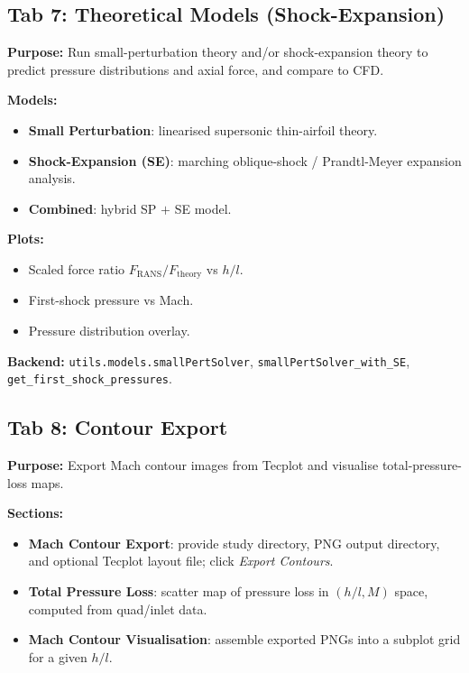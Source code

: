 \documentclass[11pt,letterpaper]{article}
\begin{document}
\subsection{Tab 7: Theoretical Models (Shock-Expansion)}

\textbf{Purpose:} Run small-perturbation theory and/or shock-expansion theory
to predict pressure distributions and axial force, and compare to CFD.

\textbf{Models:}
\begin{itemize}
  \item \textbf{Small Perturbation}: linearised supersonic thin-airfoil theory.
  \item \textbf{Shock-Expansion (SE)}: marching oblique-shock / Prandtl-Meyer
        expansion analysis.
  \item \textbf{Combined}: hybrid SP $+$ SE model.
\end{itemize}

\textbf{Plots:}
\begin{itemize}
  \item Scaled force ratio $F_{\text{RANS}}/F_{\text{theory}}$ vs $h/l$.
  \item First-shock pressure vs Mach.
  \item Pressure distribution overlay.
\end{itemize}

\textbf{Backend:} \texttt{utils.models.smallPertSolver},
\texttt{smallPertSolver\_with\_SE}, \texttt{get\_first\_shock\_pressures}.

\subsection{Tab 8: Contour Export}

\textbf{Purpose:} Export Mach contour images from Tecplot and visualise
total-pressure-loss maps.

\textbf{Sections:}
\begin{itemize}
  \item \textbf{Mach Contour Export}: provide study directory, PNG output
        directory, and optional Tecplot layout file; click \emph{Export
        Contours}.
  \item \textbf{Total Pressure Loss}: scatter map of pressure loss in
        $(h/l, M)$ space, computed from quad/inlet data.
  \item \textbf{Mach Contour Visualisation}: assemble exported PNGs into a
        subplot grid for a given $h/l$.
\end{itemize}
\end{document}
